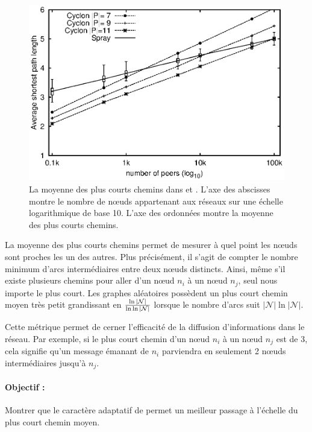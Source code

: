\begin{figure}
  \centering
  \includegraphics[width=.8\textwidth]{img/spray/avgpath.eps}
  \caption[Plus courts chemins moyens]{\label{net:fig:shortestpath} La moyenne
    des plus courts chemins dans \SPRAY et \CYCLON. L'axe des abscisses montre
    le nombre de nœuds appartenant aux réseaux sur une échelle logarithmique de
    base 10. L'axe des ordonnées montre la moyenne des plus courts chemins.}
\end{figure}

La moyenne des plus courts chemins permet de mesurer à quel point les nœuds sont
proches les un des autres. Plus précisément, il s'agit de compter le nombre
minimum d'arcs intermédiaires entre deux nœuds distincts. Ainsi, même s'il
existe plusieurs chemins pour aller d'un nœud $n_i$ à un nœud $n_j$, seul nous
importe le plus court.  Les graphes aléatoires possèdent un plus court chemin
moyen très petit grandissant en $\ln|\mathcal{N}|\over\ln\ln|\mathcal{N}|$
lorsque le nombre d'arcs suit $|\mathcal{N}|\ln|\mathcal{N}|$.

Cette métrique permet de cerner l'efficacité de la diffusion d'informations dans
le réseau. Par exemple, si le plus court chemin d'un nœud $n_i$ à un nœud $n_j$
est de 3, cela signifie qu'un message émanant de $n_i$ parviendra en seulement 2
nœuds intermédiaires jusqu'à $n_j$.

\paragraph{Objectif :} Montrer que le caractère adaptatif de \SPRAY permet un
meilleur passage à l'échelle du plus court chemin moyen.

